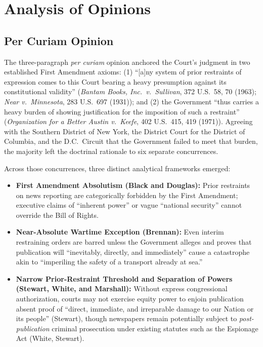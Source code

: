 \documentclass[12pt]{article}
\begin{document}
\section{Analysis of Opinions}
\subsection{Per Curiam Opinion}

The three-paragraph \textit{per curiam} opinion anchored the Court's judgment in two established First Amendment axioms: (1) ``[a]ny system of prior restraints of expression comes to this Court bearing a heavy presumption against its constitutional validity'' (\textit{Bantam Books, Inc.\ v.\ Sullivan}, 372 U.S.\ 58, 70 (1963); \textit{Near v.\ Minnesota}, 283 U.S.\ 697 (1931)); and (2) the Government ``thus carries a heavy burden of showing justification for the imposition of such a restraint'' (\textit{Organization for a Better Austin v.\ Keefe}, 402 U.S.\ 415, 419 (1971)). Agreeing with the Southern District of New York, the District Court for the District of Columbia, and the D.C.\ Circuit that the Government failed to meet that burden, the majority left the doctrinal rationale to six separate concurrences.

Across those concurrences, three distinct analytical frameworks emerged:
\begin{itemize}
    \item \textbf{First Amendment Absolutism (Black and Douglas):} Prior restraints on news reporting are categorically forbidden by the First Amendment; executive claims of ``inherent power'' or vague ``national security'' cannot override the Bill of Rights.
    \item \textbf{Near-Absolute Wartime Exception (Brennan):} Even interim restraining orders are barred unless the Government alleges and proves that publication will ``inevitably, directly, and immediately'' cause a catastrophe akin to ``imperiling the safety of a transport already at sea.''
    \item \textbf{Narrow Prior-Restraint Threshold and Separation of Powers (Stewart, White, and Marshall):} Without express congressional authorization, courts may not exercise equity power to enjoin publication absent proof of ``direct, immediate, and irreparable damage to our Nation or its people'' (Stewart), though newspapers remain potentially subject to \emph{post-publication} criminal prosecution under existing statutes such as the Espionage Act (White, Stewart).
\end{itemize}
\end{document}
